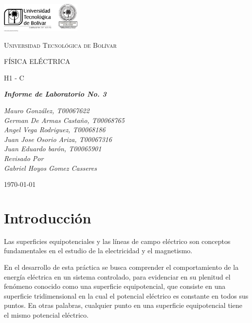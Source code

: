 \documentclass[letterpaper, 12pt]{report}
\begin{document}
\begin{titlepage}
	\centering
	\includegraphics[width=0.3\textwidth]{Images/logo_utb.png}\par\vspace{1cm}
	{\scshape\LARGE Universidad Tecnológica de Bolívar \par}
	\vspace{1cm}

	{\scshape\Large FÍSICA ELÉCTRICA \par}
	\vspace{.2cm}

	{\scshape\Large H1 - C \par}
	\vspace{1cm}
	\slshape {\Large \bfseries{}Informe de Laboratorio No. 3 \\}
	\vspace{1cm}

	\slshape {\itshape{} Mauro González, T00067622 \\}
	\slshape {\itshape{} German De Armas Castaño, T00068765 \\}
	\slshape {\itshape{} Angel Vega Rodriguez, T00068186 \\}
	\slshape {\itshape{} Juan Jose Osorio Ariza, T00067316 \\}
	\slshape {\itshape{} Juan Eduardo barón, T00065901 \\}
	\vfill
	Revisado Por \\
	Gabriel Hoyos Gomez Casseres\\
	{\large \today\par}
\end{titlepage}

\section{Introducción}

Las superficies equipotenciales y las líneas de campo eléctrico son conceptos
fundamentales en el estudio de la electricidad y el magnetismo.

\vspace{.5cm}

En el desarrollo de esta práctica se busca comprender el comportamiento de
la energía eléctrica en un sistema controlado, para evidenciar en su plenitud
el fenómeno conocido como una superficie equipotencial, que consiste en una
superficie tridimensional en la cual el potencial eléctrico es constante en
todos sus puntos. En otras palabras, cualquier punto en una superficie
equipotencial tiene el mismo potencial eléctrico.
\end{document}
